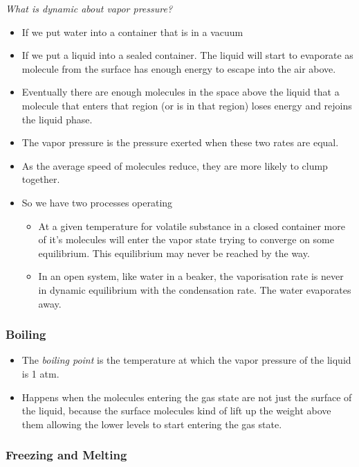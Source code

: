 \documentclass[12pt]{article}
\begin{document}
\emph{What is dynamic about vapor pressure?}

\begin{itemize}
\item
  If we put water into a container that is in a vacuum
\item
  If we put a liquid into a sealed container. The liquid will start to
  evaporate as molecule from the surface has enough energy to escape
  into the air above.
\item
  Eventually there are enough molecules in the space above the liquid
  that a molecule that enters that region (or is in that region) loses
  energy and rejoins the liquid phase.
\item
  The vapor pressure is the pressure exerted when these two rates are
  equal.
\item
  As the average speed of molecules reduce, they are more likely to
  clump together.
\item
  So we have two processes operating

  \begin{itemize}
  \item
    At a given temperature for volatile substance in a closed container
    more of it's molecules will enter the vapor state trying to converge
    on some equilibrium. This equilibrium may never be reached by the
    way.
  \item
    In an open system, like water in a beaker, the vaporisation rate is
    never in dynamic equilibrium with the condensation rate. The water
    evaporates away.
  \end{itemize}
\end{itemize}

\subsubsection{Boiling}\label{boiling}

\begin{itemize}
\item
  The \emph{boiling point} is the temperature at which the vapor
  pressure of the liquid is 1 atm.
\item
  Happens when the molecules entering the gas state are not just the
  surface of the liquid, because the surface molecules kind of lift up
  the weight above them allowing the lower levels to start entering the
  gas state.
\end{itemize}

\subsubsection{Freezing and Melting}\label{freezing-and-melting}
\end{document}
